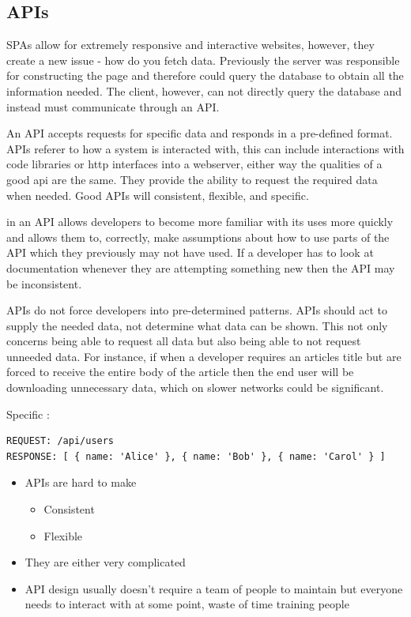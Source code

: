 \documentclass[
  12pt,
]{article}
\providecommand{\tightlist}{%
  \setlength{\itemsep}{0pt}\setlength{\parskip}{0pt}}
\begin{document}
\hypertarget{apis}{%
\subsection{APIs}\label{apis}}

SPAs allow for extremely responsive and interactive websites, however,
they create a new issue - how do you fetch data. Previously the server
was responsible for constructing the page and therefore could query the
database to obtain all the information needed. The client, however, can
not directly query the database and instead must communicate through an
API.

An API accepts requests for specific data and responds in a pre-defined
format. APIs referer to how a system is interacted with, this can
include interactions with code libraries or http interfaces into a
webserver, either way the qualities of a good api are the same. They
provide the ability to request the required data when needed. Good APIs
will consistent, flexible, and specific.

\begin{description}
\tightlist
\item[Consistency]
in an API allows developers to become more familiar with its uses more
quickly and allows them to, correctly, make assumptions about how to use
parts of the API which they previously may not have used. If a developer
has to look at documentation whenever they are attempting something new
then the API may be inconsistent.
\item[Flexible]
APIs do not force developers into pre-determined patterns. APIs should
act to supply the needed data, not determine what data can be shown.
This not only concerns being able to request all data but also being
able to not request unneeded data. For instance, if when a developer
requires an articles title but are forced to receive the entire body of
the article then the end user will be downloading unnecessary data,
which on slower networks could be significant.
\end{description}

Specific :

\begin{lstlisting}[caption={A mock example of an API request and it corresponding response.}]
REQUEST: /api/users
RESPONSE: [ { name: 'Alice' }, { name: 'Bob' }, { name: 'Carol' } ]
\end{lstlisting}

\begin{itemize}
\tightlist
\item
  APIs are hard to make

  \begin{itemize}
  \tightlist
  \item
    Consistent
  \item
    Flexible
  \end{itemize}
\item
  They are either very complicated
\item
  API design usually doesn't require a team of people to maintain but
  everyone needs to interact with at some point, waste of time training
  people
\end{itemize}
\end{document}
